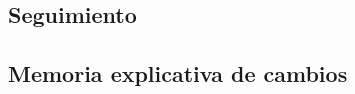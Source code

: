 \subsection{Seguimiento}\label{subsec:seguimiento}
    
\subsection{Memoria explicativa de cambios}\label{subsec:memoria explicativa de cambios}
    



